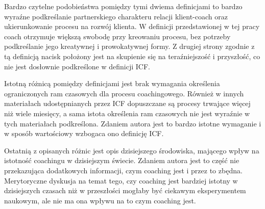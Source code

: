 Bardzo czytelne podobieństwa pomiędzy tymi dwiema definicjami to bardzo wyraźne podkreślanie partnerskiego charakteru relacji klient-coach
oraz ukierunkowanie procesu na rozwój klienta. W definicji przedstawionej w tej pracy coach otrzymuje większą swobodę przy kreowaniu procesu, bez
potrzeby podkreślanie jego kreatywnej i prowokatywnej formy. Z drugiej strony zgodnie z tą definicją nacisk położony jest na skupienie się na
teraźniejszość i przyszłość, co nie jest dosłownie podkreślone w definicji ICF.

Istotną różnicą pomiędzy definicjami jest brak wymagania określenia ograniczonych ram czasowych dla procesu coachingowego. Również w innych materiałach
udostępnianych przez ICF dopuszczane są procesy trwające więcej niż wiele miesięcy, a sama istota określenia ram czasowych nie jest wyraźnie w tych materiałach
podkreślona. Zdaniem autora jest to bardzo istotne wymaganie i w sposób wartościowy wzbogaca ono definicję ICF.

Ostatnią z opisanych różnic jest opis dzisiejszego środowiska, mającego wpływ na istotność coachingu w dzisiejszym świecie. Zdaniem autora jest to część
nie przekazująca dodatkowych informacji, czym coaching jest i przez to zbędna. Merytoryczne dyskusja na temat tego, czy coaching jest bardziej istotny w dzisiejszych czasach
niż w przeszłości mogłaby być ciekawym eksperymentem naukowym, ale nie ma ona wpływu na to czym coaching jest.
